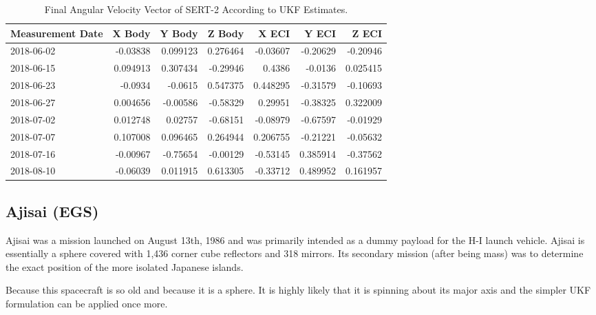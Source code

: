\begin{table}[htbp]\label{sert_table}
	\centering
	
	\begin{tabular}{|l|r|r|r|r|r|r|}
		\hline Measurement Date & X Body & Y Body & Z Body & X ECI & Y ECI & Z ECI \\
		\hline 2018-06-02 & -0.03838 & 0.099123 & 0.276464 & -0.03607 & -0.20629 & -0.20946 \\
		\hline 2018-06-15 & 0.094913 & 0.307434 & -0.29946 & 0.4386 & -0.0136 & 0.025415 \\
		\hline 2018-06-23 & -0.0934 & -0.0615 & 0.547375 & 0.448295 & -0.31579 & -0.10693 \\
		\hline 2018-06-27 & 0.004656 & -0.00586 & -0.58329 & 0.29951 & -0.38325 & 0.322009 \\
		\hline 2018-07-02 & 0.012748 & 0.02757 & -0.68151 & -0.08979 & -0.67597 & -0.01929 \\
		\hline 2018-07-07 & 0.107008 & 0.096465 & 0.264944 & 0.206755 & -0.21221 & -0.05632 \\
		\hline 2018-07-16 & -0.00967 & -0.75654 & -0.00129 & -0.53145 & 0.385914 & -0.37562 \\
		\hline 2018-08-10 & -0.06039 & 0.011915 & 0.613305 & -0.33712 & 0.489952 & 0.161957 \\
		\hline 
	\end{tabular}%
	\caption{Final Angular Velocity Vector of SERT-2 According to UKF Estimates.}
\end{table}%



\subsection{Ajisai (EGS)}

Ajisai was a mission launched on August 13th, 1986 and was primarily intended as a dummy payload for the H-I launch vehicle. \cite{ajisai_jaxa} Ajisai is essentially a sphere covered with 1,436 corner cube reflectors and 318 mirrors. \cite{ajisai} Its secondary mission (after being mass) was to determine the exact position of the more isolated Japanese islands. \cite{ajisai_jaxa}

Because this spacecraft is so old and because it is a sphere. It is highly likely that it is spinning about its major axis and the simpler UKF formulation can be applied once more.

